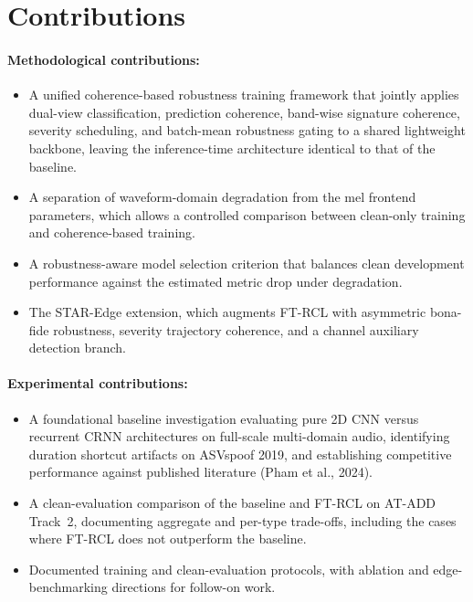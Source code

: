 \section{Contributions}

\paragraph{Methodological contributions:}
\begin{itemize}
  \item A unified coherence-based robustness training framework that jointly applies dual-view classification, prediction coherence, band-wise signature coherence, severity scheduling, and batch-mean robustness gating to a shared lightweight backbone, leaving the inference-time architecture identical to that of the baseline.
  \item A separation of waveform-domain degradation from the mel frontend parameters, which allows a controlled comparison between clean-only training and coherence-based training.
  \item A robustness-aware model selection criterion that balances clean development performance against the estimated metric drop under degradation.
  \item The STAR-Edge extension, which augments FT-RCL with asymmetric bona-fide robustness, severity trajectory coherence, and a channel auxiliary detection branch.
\end{itemize}

\clearpage
\paragraph{Experimental contributions:}
\begin{itemize}
  \item A foundational baseline investigation evaluating pure 2D CNN versus recurrent CRNN architectures on full-scale multi-domain audio, identifying duration shortcut artifacts on ASVspoof 2019, and establishing competitive performance against published literature (Pham et al., 2024).
  \item A clean-evaluation comparison of the baseline and FT-RCL on AT-ADD Track~2, documenting aggregate and per-type trade-offs, including the cases where FT-RCL does not outperform the baseline.
  \item Documented training and clean-evaluation protocols, with ablation and edge-benchmarking directions for follow-on work.
\end{itemize}
